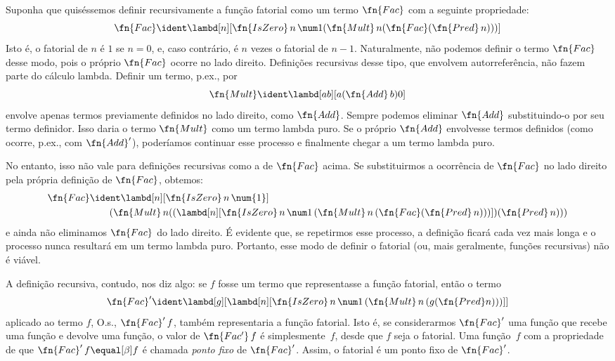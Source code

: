 \documentclass[../../../include/open-logic-section]{subfiles}
\begin{document}


Suponha que quiséssemos definir recursivamente a função fatorial como um
termo $\fn{Fac}$ com a seguinte propriedade:
\[
\fn{Fac} \ident \lambd[n][\fn{IsZero}\, n\, \num 1 (\fn{Mult}\, n (\fn{Fac}(\fn{Pred} \, n)))]
\]
Isto é, o fatorial de $n$ é $1$ se $n = 0$, e, caso contrário, é $n$ vezes o
fatorial de $n-1$. Naturalmente, não podemos definir o termo
$\fn{Fac}$ desse modo, pois o próprio $\fn{Fac}$ ocorre no lado
direito. Definições recursivas desse tipo, que envolvem autorreferência,
não fazem parte do cálculo lambda. Definir um termo, p.ex., por
\[
\fn{Mult} \ident \lambd[ab][a (\fn{Add}\, b) 0]
\]
envolve apenas termos previamente definidos no lado direito, como
$\fn{Add}$. Sempre podemos eliminar $\fn{Add}$ substituindo-o por seu
termo definidor. Isso daria o termo $\fn{Mult}$ como um termo lambda
puro. Se o próprio $\fn{Add}$ envolvesse termos definidos (como ocorre, p.ex.,
com $\fn{Add}'$), poderíamos continuar esse processo e finalmente chegar a
um termo lambda puro.

No entanto, isso não vale para definições recursivas como a de
$\fn{Fac}$ acima. Se substituirmos a ocorrência de $\fn{Fac}$ no
lado direito pela própria definição de $\fn{Fac}$, obtemos:
\begin{align*}
  \fn{Fac} & \ident \lambd[n][\fn{IsZero}\, n\, \num{1}] \\
    & \qquad (\fn{Mult}\, n
  ((\lambd[n][\fn{IsZero} \, n \, \num 1\, (\fn{Mult}\, n\, (\fn{Fac}
    (\fn{Pred}\, n)))]) (\fn{Pred}\, n)))
\end{align*}
e ainda não eliminamos $\fn{Fac}$ do lado direito.
É evidente que, se repetirmos esse processo, a definição ficará cada vez
mais longa e o processo nunca resultará em um termo lambda puro. Portanto, esse
modo de definir o fatorial (ou, mais geralmente, funções recursivas)
não é viável.

A definição recursiva, contudo, nos diz algo: se $f$ fosse um
termo que representasse a função fatorial, então o termo
\[
\fn{Fac}' \ident \lambd[g][\lambd[n][\fn{IsZero} \, n \, \num 1\, (\fn{Mult} \, n\, (g (\fn{Pred} n)))]]
\]
aplicado ao termo $f$, O.s.\@, $\fn{Fac}'\,f$, também representaria a
função fatorial. Isto é, se considerarmos $\fn{Fac}'$ uma função
que recebe uma função e devolve uma função, o valor de
$\fn{Fac'}\, f$ é simplesmente~$f$, desde que $f$ seja o fatorial. Uma
função~$f$ com a propriedade de que $\fn{Fac}' \, f \equal[\beta] f$ é chamada
\emph{ponto fixo} de $\fn{Fac}'$. Assim, o fatorial é um ponto fixo de
$\fn{Fac}'$.
\end{document}
